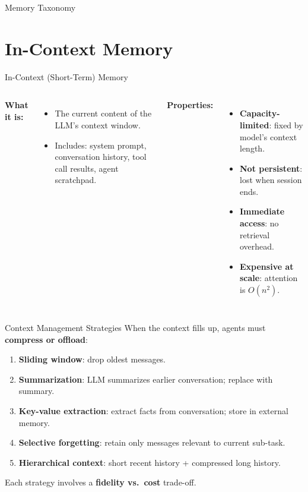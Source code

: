 \documentclass[aspectratio=169,10pt]{beamer}
\begin{document}
\begin{frame}{Memory Taxonomy}
  
\end{frame}

\section{In-Context Memory}

\begin{frame}{In-Context (Short-Term) Memory}
  \begin{columns}[T]
      \textbf{What it is:}
      \begin{itemize}
        \item The current content of the LLM's context window.
        \item Includes: system prompt, conversation history, tool call results, agent scratchpad.
      \end{itemize}
      \vspace{0.4em}
      \textbf{Properties:}
      \begin{itemize}
        \item \textbf{Capacity-limited}: fixed by model's context length.
        \item \textbf{Not persistent}: lost when session ends.
        \item \textbf{Immediate access}: no retrieval overhead.
        \item \textbf{Expensive at scale}: attention is $O(n^2)$.
      \end{itemize}
  \end{columns}
\end{frame}

\begin{frame}{Context Management Strategies}
  When the context fills up, agents must \textbf{compress or offload}:
  \vspace{0.4em}
  \begin{enumerate}
    \item \textbf{Sliding window}: drop oldest messages.
    \item \textbf{Summarization}: LLM summarizes earlier conversation; replace with summary.
    \item \textbf{Key-value extraction}: extract facts from conversation; store in external memory.
    \item \textbf{Selective forgetting}: retain only messages relevant to current sub-task.
    \item \textbf{Hierarchical context}: short recent history + compressed long history.
  \end{enumerate}
  \vspace{0.3em}
  Each strategy involves a \textbf{fidelity vs.\ cost} trade-off.
\end{frame}
\end{document}
